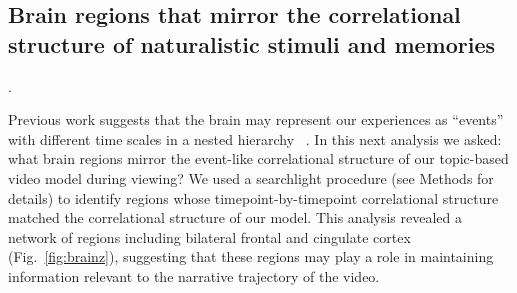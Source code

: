 




\subsection*{Brain regions that mirror the correlational structure of naturalistic stimuli and memories}.


Previous work suggests that the brain may represent our experiences as ``events'' with different time scales in a nested hierarchy ~\citep{LernEtal11, ChenEtal17, BaldEtal17}. In this next analysis we asked: what brain regions mirror the event-like correlational structure of our topic-based video model during viewing? We used a searchlight procedure (see Methods for details) to identify regions whose timepoint-by-timepoint correlational structure matched the correlational structure of our model. This analysis revealed a network of regions including bilateral frontal and cingulate cortex (Fig.~\ref{fig:brainz}), suggesting that these regions may play a role in maintaining information relevant to the narrative trajectory of the video.

